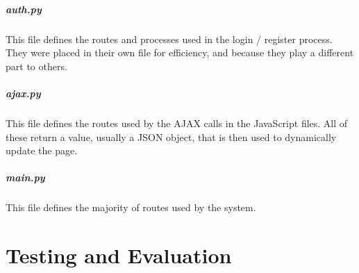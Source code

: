 \documentclass{article}[12pt,a4paper]
\begin{document}
\subsubsection{auth.py}
This file defines the routes and processes used in the login / register process. They were placed in their own file for efficiency, and because they play a different part to others.


\subsubsection{ajax.py}
This file defines the routes used by the AJAX calls in the JavaScript files. All of these return a value, usually a JSON object, that is then used to dynamically update the page.


\subsubsection{main.py}
This file defines the majority of routes used by the system.


\cleardoublepage


\part{Testing and Evaluation}

\end{document}
